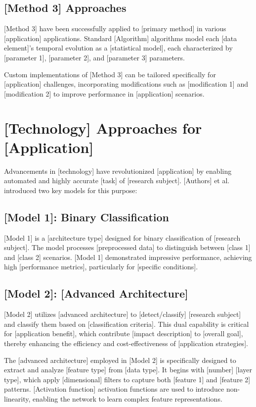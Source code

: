 \subsection{[Method 3] Approaches}

[Method 3] have been successfully applied to [primary method] in various [application] applications. Standard [Algorithm] algorithms model each [data element]'s temporal evolution as a [statistical model], each characterized by [parameter 1], [parameter 2], and [parameter 3] parameters.

Custom implementations of [Method 3] can be tailored specifically for [application] challenges, incorporating modifications such as [modification 1] and [modification 2] to improve performance in [application] scenarios.

\section{[Technology] Approaches for [Application]}

Advancements in [technology] have revolutionized [application] by enabling automated and highly accurate [task] of [research subject]. [Authors] et al. introduced two key models for this purpose:

\subsection{[Model 1]: Binary Classification}

[Model 1] is a [architecture type] designed for binary classification of [research subject]. The model processes [preprocessed data] to distinguish between [class 1] and [class 2] scenarios. [Model 1] demonstrated impressive performance, achieving high [performance metrics], particularly for [specific conditions].

\subsection{[Model 2]: [Advanced Architecture]}

[Model 2] utilizes [advanced architecture] to [detect/classify] [research subject] and classify them based on [classification criteria]. This dual capability is critical for [application benefit], which contribute [impact description] to [overall goal], thereby enhancing the efficiency and cost-effectiveness of [application strategies].

The [advanced architecture] employed in [Model 2] is specifically designed to extract and analyze [feature type] from [data type]. It begins with [number] [layer type], which apply [dimensional] filters to capture both [feature 1] and [feature 2] patterns. [Activation function] activation functions are used to introduce non-linearity, enabling the network to learn complex feature representations.

